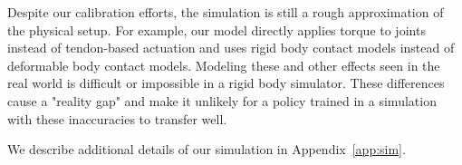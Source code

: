 Despite our calibration efforts, the simulation is still a rough approximation of the physical setup.
For example, our model directly applies torque to joints instead of tendon-based actuation and uses rigid body contact models instead of deformable body contact models.
Modeling these and other effects seen in the real world is difficult or impossible in a rigid body simulator. %
These differences cause a "reality gap" and make it unlikely for a policy trained in a simulation with these inaccuracies to transfer well.

We describe additional details of our simulation in Appendix~\ref{app:sim}.

